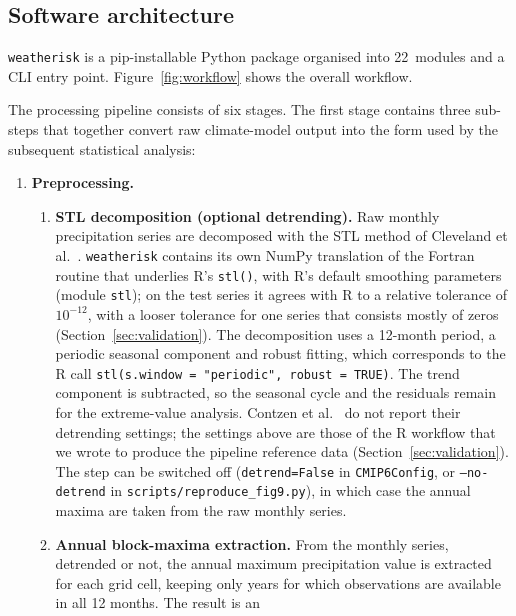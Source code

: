 \documentclass[preprint,12pt,a4paper]{elsarticle}
\newcommand{\rev}[1]{{#1}}
\newcommand{\revt}[1]{{#1}}
\begin{document}
\subsection{Software architecture}
\label{sec:architecture}

\texttt{weatherisk} is a pip-installable Python package organised
into 22~modules and a CLI entry point.  Figure~\ref{fig:workflow}
shows the overall workflow.

\rev{The processing pipeline consists of six stages. The first
stage contains three sub-steps that together convert raw climate-model
output into the form used by the subsequent statistical analysis:}

\begin{enumerate}
\item \textbf{\rev{Preprocessing.}}
  \begin{enumerate}
  \item[\textbf{(a)}] \textbf{\rev{STL decomposition (optional detrending).}}
    Raw monthly precipitation series are decomposed with the STL
    method of Cleveland et al.~\cite{cleveland1990}. \texttt{weatherisk}
    contains its own NumPy translation of the Fortran routine that
    underlies R's \texttt{stl()}, with R's default smoothing
    parameters (module \texttt{stl}); on the test series it agrees
    with R to a relative tolerance of $10^{-12}$, with a looser
    tolerance for one series that consists mostly of zeros
    (Section~\ref{sec:validation}). The decomposition uses a
    12-month period, a periodic seasonal component and robust
    fitting, which corresponds to the R call \texttt{stl(s.window =
    "periodic", robust = TRUE)}. The trend component is subtracted,
    so the seasonal cycle and the residuals remain for the
    extreme-value analysis. Contzen et al.~\cite{contzen2025} do not
    report their detrending settings; the settings above are those of
    the R workflow that we wrote to produce the pipeline reference
    data (Section~\ref{sec:validation}). The step can be
    switched off (\texttt{detrend=False} in \texttt{CMIP6Config}, or
    \texttt{--no-detrend} in \texttt{scripts/reproduce\_fig9.py}), in
    which case the annual maxima are taken from the raw monthly series.
  \item[\textbf{(b)}] \textbf{\rev{Annual block-maxima extraction.}}
    \rev{From the monthly series, detrended or not, the annual maximum
    precipitation value is extracted for each grid cell, \revt{keeping
    only years for which observations are available in all 12 months}.
    The result is an
}
\end{enumerate}
\end{enumerate}
\end{document}
